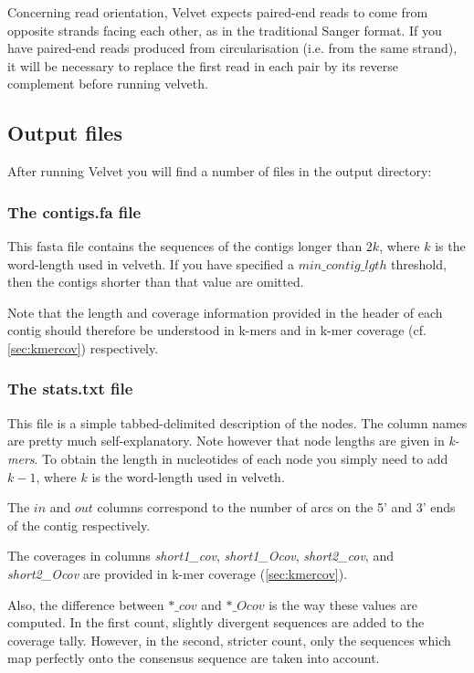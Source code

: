 \documentclass{article}
\begin{document}
Concerning read orientation, Velvet expects paired-end reads to come from opposite strands facing each other, as in the traditional Sanger format. If you have paired-end reads produced from circularisation (i.e. from the same strand), it will be necessary to replace the first read in each pair by its reverse complement before running velveth.

\subsection{Output files} 

\label{sec:output}

After running Velvet you will find a number of files in the output directory:

\subsubsection{The contigs.fa file}

\label{sec:fasta}

This fasta file contains the sequences of the contigs longer than $2k$, where $k$ is the word-length used in velveth. If you have specified a $min\_contig\_lgth$ threshold, then the contigs shorter than that value are omitted.

Note that the length and coverage information provided in the header of each contig should therefore be understood in k-mers and in k-mer coverage (cf. \ref{sec:kmercov}) respectively.

\subsubsection{The stats.txt file}

\label{sec:stats}

This file is a simple tabbed-delimited description of the nodes. The column names are pretty much self-explanatory. Note however that node lengths are given in \emph{k-mers}. To obtain the length in nucleotides of each node you simply need to add $k-1$, where $k$ is the word-length used in velveth.

The $in$ and $out$ columns correspond to the number of arcs on the 5' and 3' ends of the contig respectively.

The coverages in columns \emph{short1\_cov}, \emph{short1\_Ocov}, \emph{short2\_cov}, and \emph{short2\_Ocov} are provided in k-mer coverage (\ref{sec:kmercov}).

Also, the difference between $*\_cov$ and $*\_Ocov$ is the way these values are computed. In the first count, slightly divergent sequences are added to the coverage tally. However, in the second, stricter count, only the sequences which map perfectly onto the consensus sequence are taken into account.
\end{document}
